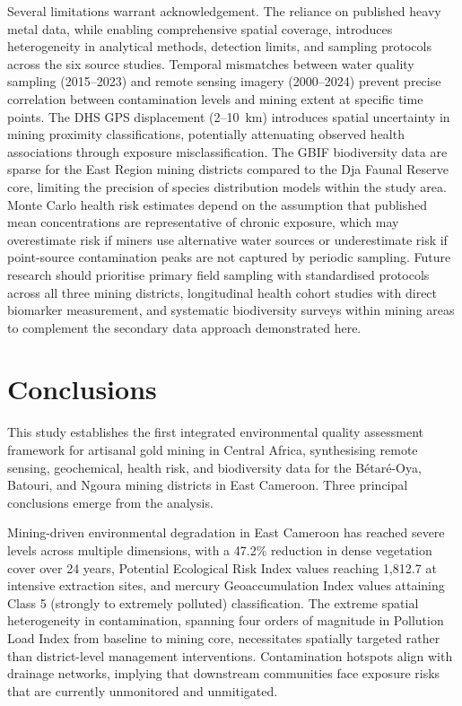 \documentclass[preprint,12pt,authoryear]{elsarticle}
\begin{document}
Several limitations warrant acknowledgement. The reliance on published heavy metal data, while enabling comprehensive spatial coverage, introduces heterogeneity in analytical methods, detection limits, and sampling protocols across the six source studies. Temporal mismatches between water quality sampling (2015--2023) and remote sensing imagery (2000--2024) prevent precise correlation between contamination levels and mining extent at specific time points. The DHS GPS displacement (2--10~km) introduces spatial uncertainty in mining proximity classifications, potentially attenuating observed health associations through exposure misclassification. The GBIF biodiversity data are sparse for the East Region mining districts compared to the Dja Faunal Reserve core, limiting the precision of species distribution models within the study area. Monte Carlo health risk estimates depend on the assumption that published mean concentrations are representative of chronic exposure, which may overestimate risk if miners use alternative water sources or underestimate risk if point-source contamination peaks are not captured by periodic sampling. Future research should prioritise primary field sampling with standardised protocols across all three mining districts, longitudinal health cohort studies with direct biomarker measurement, and systematic biodiversity surveys within mining areas to complement the secondary data approach demonstrated here.


\section{Conclusions}

This study establishes the first integrated environmental quality assessment framework for artisanal gold mining in Central Africa, synthesising remote sensing, geochemical, health risk, and biodiversity data for the B\'{e}tar\'{e}-Oya, Batouri, and Ngoura mining districts in East Cameroon. Three principal conclusions emerge from the analysis.

Mining-driven environmental degradation in East Cameroon has reached severe levels across multiple dimensions, with a 47.2\% reduction in dense vegetation cover over 24 years, Potential Ecological Risk Index values reaching 1,812.7 at intensive extraction sites, and mercury Geoaccumulation Index values attaining Class 5 (strongly to extremely polluted) classification. The extreme spatial heterogeneity in contamination, spanning four orders of magnitude in Pollution Load Index from baseline to mining core, necessitates spatially targeted rather than district-level management interventions. Contamination hotspots align with drainage networks, implying that downstream communities face exposure risks that are currently unmonitored and unmitigated.
\end{document}
